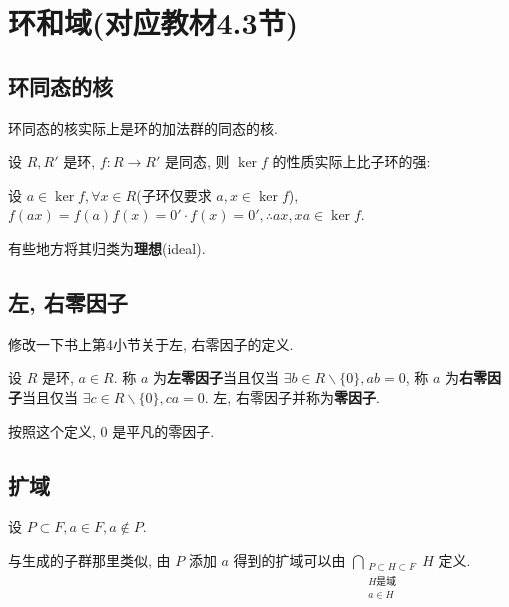 \documentclass{ctexart}
\begin{document}
\section{环和域(对应教材4.3节)}
\subsection{环同态的核}
环同态的核实际上是环的加法群的同态的核.

设 $R,R'$ 是环, $f:R\to R'$ 是同态, 则 $\ker f$ 的性质实际上比子环的强:

设 $a\in\ker f,\forall x\in R$(子环仅要求 $a,x\in\ker f$), $f(ax)=f(a)f(x)=0'\cdot f(x)=0',\therefore ax,xa\in\ker f$.

有些地方将其归类为\textbf{理想}(ideal).
\subsection{左, 右零因子}
修改一下书上第4小节关于左, 右零因子的定义.
\begin{definition}
    设 $R$ 是环, $a\in R$. 称 $a$ 为\textbf{左零因子}当且仅当 $\exists b\in R\backslash\{0\},ab=0$, 称 $a$ 为\textbf{右零因子}当且仅当 $\exists c\in R\backslash\{0\},ca=0$. 左, 右零因子并称为\textbf{零因子}.
\end{definition}

按照这个定义, $0$ 是平凡的零因子.
\subsection{扩域}
设 $P\subset F,a\in F,a\notin P$.

与生成的子群那里类似, 由 $P$ 添加 $a$ 得到的扩域可以由 $\bigcap\limits_{\substack{P\subset H\subset F\\H\text{是域}\\a\in H}}H$ 定义.
\end{document}
